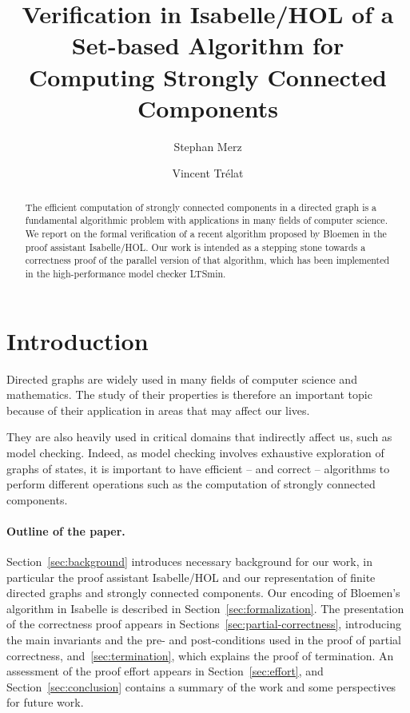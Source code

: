 \documentclass[sigplan,10pt,anonymous,review]{acmart}
\title{Verification in Isabelle/HOL of a Set-based Algorithm for Computing Strongly Connected Components}
\author{Stephan Merz}
\affiliation{
  \institution{University of Lorraine, CNRS, Inria, LORIA}
  \city{Nancy}
  \country{France}
}
\author{Vincent Trélat}
\affiliation{
  \institution{University of Lorraine}
  \city{Nancy}
  \country{France}
}
\begin{document}
\begin{abstract}
  The efficient computation of strongly connected components in a directed graph is a fundamental algorithmic problem with applications in many fields of computer science. We report on the formal verification of a recent algorithm proposed by Bloemen in the proof assistant Isabelle/HOL. Our work is intended as a stepping stone towards a correctness proof of the parallel version of that algorithm, which has been implemented in the high-performance model checker LTSmin.
\end{abstract}

\maketitle

\section{Introduction}
\label{sec:introduction}
Directed graphs are widely used in many fields of computer science and mathematics.
The study of their properties is therefore an important topic because of their application in areas that may affect our lives.

They are also heavily used in critical domains that indirectly affect us, such as model checking.
Indeed, as model checking involves exhaustive exploration of graphs of states, it is important to have efficient -- and correct -- algorithms to perform different operations such as the computation of strongly connected components.

\paragraph{Outline of the paper.}

Section~\ref{sec:background} introduces necessary background for our work, in particular the proof assistant Isabelle/HOL and our representation of finite directed graphs and strongly connected components. Our encoding of Bloemen's algorithm in Isabelle is described in Section~\ref{sec:formalization}. The presentation of the correctness proof appears in Sections~\ref{sec:partial-correctness}, introducing the main invariants and the pre- and post-conditions used in the proof of partial correctness, and~\ref{sec:termination}, which explains the proof of termination. An assessment of the proof effort appears in Section~\ref{sec:effort}, and Section~\ref{sec:conclusion} contains a summary of the work and some perspectives for future work.
\end{document}
